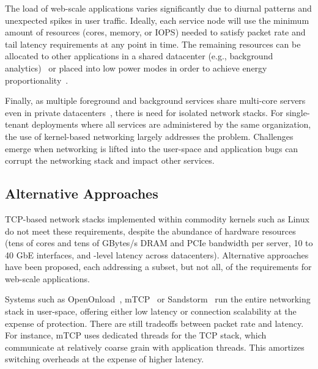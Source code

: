  The load of web-scale applications
varies significantly due to diurnal patterns and unexpected spikes in
user traffic. Ideally, each service node will use the minimum amount
of resources (cores, memory, or IOPS) needed to satisfy packet rate
and tail latency requirements at any point in time. The remaining
resources can be allocated to other applications in a shared
datacenter (e.g., background
analytics)~\cite{Hindman:2011:MPF,DBLP:conf/asplos/DelimitrouK14,Leverich:RHSU:2014}
or placed into low power modes in order to achieve energy
proportionality~\cite{DBLP:journals/computer/BarrosoH07, Lo:2014:TWE}.

 Finally, as multiple foreground and
background services share multi-core servers even in private
datacenters~\cite{Hindman:2011:MPF,Schwarzkopf:2013:OFS,DBLP:journals/cacm/DeanB13},
there is need for isolated network stacks. For single-tenant
deployments where all services are administered by the same
organization, the use of kernel-based networking largely addresses the
problem.  Challenges emerge when networking is lifted into the
user-space and application bugs can corrupt the networking stack and
impact other services.


\subsection{Alternative Approaches}
\label{sec:motivation:current}

TCP-based network stacks implemented within commodity kernels such as
Linux do not meet these requirements, despite the abundance of hardware
resources (tens of cores and tens of GBytes/s DRAM and PCIe
bandwidth per server, 10 to 40 GbE interfaces, and \microsecond-level
latency across datacenters).
Alternative approaches have been proposed, each addressing a subset,
but not all, of
the requirements for web-scale applications. %

 Systems such as
OpenOnload~\cite{openonload}, mTCP~\cite{jeong2014mtcp} or
Sandstorm~\cite{marinos2013network} run the entire networking stack in
user-space, offering either low latency or connection scalability at
the expense of protection. There are still tradeoffs between packet
rate and latency. For instance, mTCP uses dedicated threads for the
TCP stack, which communicate at relatively coarse grain with
application threads. This amortizes switching overheads at the expense
of higher latency.

